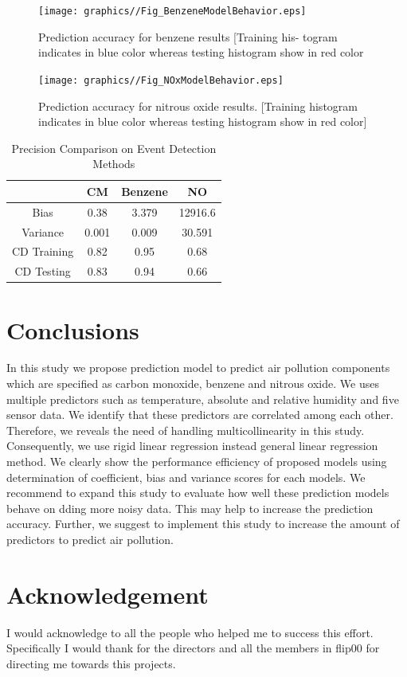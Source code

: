 \begin{figure}
  \centering
 \texttt{[image: graphics//Fig\_BenzeneModelBehavior.eps]}
  \caption{Prediction accuracy for benzene results [Training his-
  togram indicates in blue color whereas testing histogram show in
  red color} \label{Fig_BenzeneModelBehavior}
\end{figure}

\begin{figure}
  \centering
 \texttt{[image: graphics//Fig\_NOxModelBehavior.eps]}
  \caption{Prediction accuracy for nitrous oxide results. [Training
  histogram indicates in blue color whereas testing histogram show
  in red color]} \label{Fig_CM_ModelAccuracy}
\end{figure}

\begin{table}  \centering
  \caption{Precision Comparison on Event Detection Methods}
  \label{tbl:overall-experiments}
  \begin{tabular}{cccc}
\toprule
    & CM & Benzene &NO \\
\midrule
Bias & 0.38 & 3.379 & 12916.6 \\
Variance & 0.001 & 0.009 & 30.591 \\
CD Training & 0.82 & 0.95 & 0.68 \\
CD Testing & 0.83 & 0.94 & 0.66 \\
\bottomrule
\end{tabular}
\end{table}


\section{Conclusions} \label{sec-conclusions}

In this study we propose prediction model to predict air pollution components which are specified as carbon monoxide, benzene and nitrous oxide. We uses multiple predictors such as temperature, absolute and relative humidity and five sensor data.
We identify that these predictors are correlated among each other.
Therefore, we reveals the need of handling multicollinearity in this study.
Consequently, we use rigid linear regression instead general linear regression method.
We clearly show the performance efficiency of proposed 
models using determination of coefficient, bias and variance scores for each models.
We recommend to expand this study to evaluate how well these prediction models behave on dding more noisy data.
This may help to increase the prediction accuracy.
Further, we suggest to implement this study to increase the amount of predictors to predict air pollution.

\section*{Acknowledgement}
I would acknowledge to all the people who helped me to success this effort. Specifically I would thank for the directors and all the members in flip00 for directing me towards this projects.


